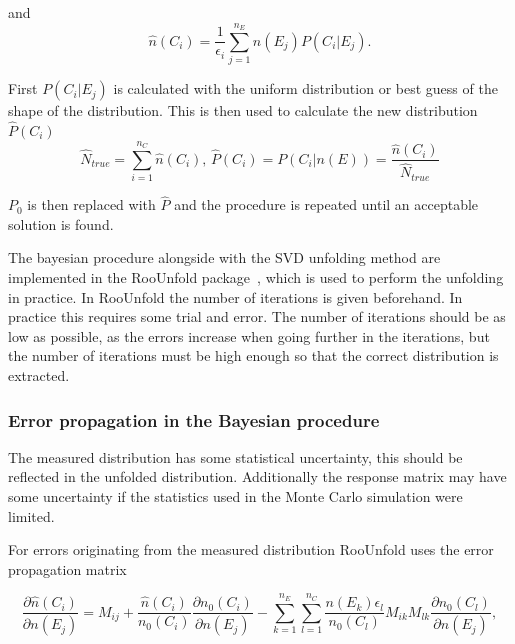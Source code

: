 \noindent and 
{
\color{red}
\begin{equation}
\hat n\left(C_i\right) = \frac{1}{\epsilon_i} \sum_{j=1}^{n_E}n\left(E_j\right)P\left(C_i | E_j\right).
\label{eq:unfolded}
\end{equation}
}

First  $P\left(C_i |E_j\right)$ is calculated with the uniform distribution or best guess of the shape of the distribution. This is then used to calculate the new distribution $\hat P\left(C_i\right)$
\begin{equation}
\hat N_{true} = \sum_{i=1}^{n_C} \hat n\left(C_i\right),\,\hat P\left(C_i\right) = P\left(C_i | n\left(E\right)\right) = \frac{\hat n\left(C_i\right)}{\hat N_{true}}
\end{equation}

$P_0$ is then replaced with $\hat P$ and the procedure is repeated until an acceptable solution is found. 

The bayesian procedure alongside with the SVD unfolding method are implemented in the RooUnfold package~\cite{roounfold}, which is used to perform the unfolding in practice. In RooUnfold the number of iterations is given beforehand. In practice this requires some trial and error. The number of iterations should be as low as possible, as the errors increase when going further in the iterations, but the number of iterations must be high enough so that the correct distribution is extracted. 
 
 \subsubsection*{Error propagation in the Bayesian procedure }
 The measured distribution has some statistical uncertainty, this should be reflected in the unfolded distribution. Additionally the response matrix may have some uncertainty if the statistics used in the Monte Carlo simulation were limited. 
 
For errors originating from the measured distribution RooUnfold uses the error propagation matrix 

\begin{equation}
\frac{\partial \hat n\left(C_i\right)}{\partial n\left(E_j\right)} = M_{ij} + \frac{\hat n\left(C_i\right)}{n_0\left(C_i\right)}\frac{\partial n_0\left(C_i\right) }{\partial n\left(E_j\right) } - \sum_{k=1}^{n_E}\sum_{l=1}^{n_C} \frac{n\left(E_k\right) \epsilon_l}{n_0\left(C_l\right)} M_{ik} M_{lk} \frac{\partial n_0 \left(C_l\right)}{\partial n\left(E_j\right)},
\end{equation} 
 
